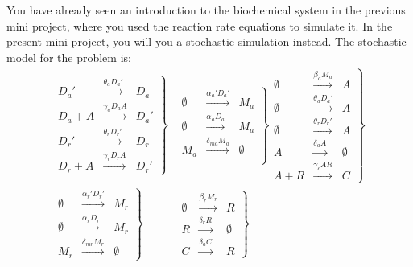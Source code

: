 \documentclass[a4paper,11pt]{article}
\begin{document}
\noindent You have already seen an introduction to the biochemical system in the previous mini project, where you used the reaction rate equations to simulate it. In the present mini project, you will you a stochastic simulation instead. The stochastic model for the problem is:
\begin{align}
 	\nonumber
  	\left. \begin{array}{rcl}
      		D_{a}' & \xrightarrow{\theta_{a} D_{a}'} & D_{a}	\\
      		D_{a}+A & \xrightarrow{\gamma_{a} D_{a} A} & D_{a}'	\\
      		D_{r}' & \xrightarrow{\theta_{r} D_{r}'} & D_{r}	\\
      		D_{r}+A & \xrightarrow{\gamma_{r} D_{r} A} & D_{r}'
    	\end{array} \right\}
  	& \left. \begin{array}{rcl}
      		\emptyset & \xrightarrow{\alpha_{a}' D_{a}'} & M_{a}	\\
      		\emptyset & \xrightarrow{\alpha_{a} D_{a}} & M_{a}	\\
      		M_{a} & \xrightarrow{\delta_{ma} M_{a}} & \emptyset	\\
    	\end{array} \right\}
  	\left. \begin{array}{rcl}
      		\emptyset & \xrightarrow{\beta_{a} M_{a}} & A		\\
      		\emptyset & \xrightarrow{\theta_{a} D_{a}'} & A		\\
      		\emptyset & \xrightarrow{\theta_{r} D_{r}'} & A		\\
      		A &\xrightarrow{\delta_{a} A} & \emptyset		\\
      		A+R &\xrightarrow{\gamma_{c} A R} & C
    	\end{array} \right\}						\\
  	\label{eq:circadian}
  	\left. \begin{array}{rcl}
      		\emptyset & \xrightarrow{\alpha_{r}' D_{r}'} & M_{r}	\\
      		\emptyset & \xrightarrow{\alpha_{r} D_{r}} & M_{r}	\\
      		M_{r} & \xrightarrow{\delta_{mr} M_{r}} & \emptyset
    	\end{array} \right\}
  	& \left. \begin{array}{rcl}
      		\emptyset & \xrightarrow{\beta_{r} M_{r}} & R		\\
      		R & \xrightarrow{\delta_{r} R} & \emptyset		\\
      		C & \xrightarrow{\delta_{a} C} & R
    	\end{array} \right\}
\end{align}
\\
\end{document}
